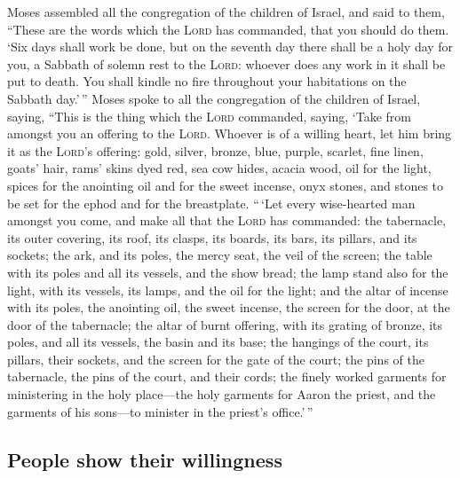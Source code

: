  Moses assembled all the congregation of the children of
Israel, and said to them, ``These are the words which the \textsc{Lord}
has commanded, that you should do them.  `Six days shall
work be done, but on the seventh day there shall be a holy day for you,
a Sabbath of solemn rest to the \textsc{Lord}: whoever does any work in
it shall be put to death.  You shall kindle no fire
throughout your habitations on the Sabbath day.'\,'' 
Moses spoke to all the congregation of the children of Israel, saying,
``This is the thing which the \textsc{Lord} commanded, saying,
 `Take from amongst you an offering to the \textsc{Lord}.
Whoever is of a willing heart, let him bring it as the \textsc{Lord}'s
offering: gold, silver, bronze,  blue, purple, scarlet,
fine linen, goats' hair,  rams' skins dyed red, sea cow
hides, acacia wood,  oil for the light, spices for the
anointing oil and for the sweet incense,  onyx stones, and
stones to be set for the ephod and for the breastplate. 
``\,`Let every wise-hearted man amongst you come, and make all that the
\textsc{Lord} has commanded:  the tabernacle, its outer
covering, its roof, its clasps, its boards, its bars, its pillars, and
its sockets;  the ark, and its poles, the mercy seat, the
veil of the screen;  the table with its poles and all its
vessels, and the show bread;  the lamp stand also for the
light, with its vessels, its lamps, and the oil for the light;
 and the altar of incense with its poles, the anointing
oil, the sweet incense, the screen for the door, at the door of the
tabernacle;  the altar of burnt offering, with its
grating of bronze, its poles, and all its vessels, the basin and its
base;  the hangings of the court, its pillars, their
sockets, and the screen for the gate of the court;  the
pins of the tabernacle, the pins of the court, and their cords;
 the finely worked garments for ministering in the holy
place---the holy garments for Aaron the priest, and the garments of his
sons---to minister in the priest's office.'\,''

\hypertarget{people-show-their-willingness}{%
\subsection{People show their
willingness}\label{people-show-their-willingness}}

